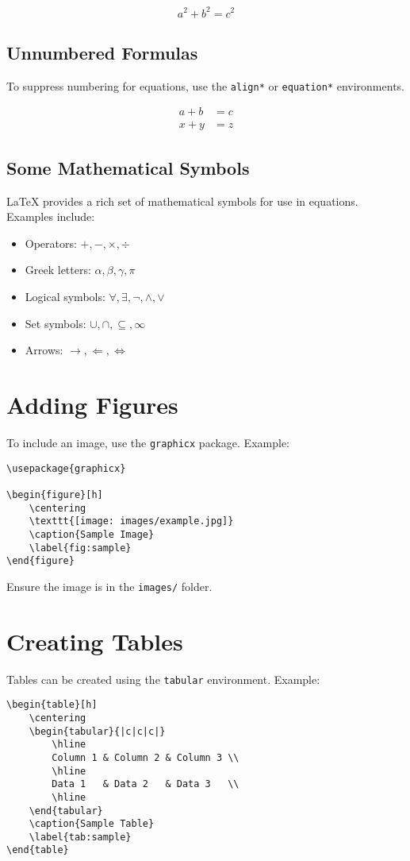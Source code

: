 \documentclass[12pt]{article}
\begin{document}
\[
a^2 + b^2 = c^2 \tag{Pythagoras}
\]

\subsection*{Unnumbered Formulas}
To suppress numbering for equations, use the \texttt{align*} or \texttt{equation*} environments.

\begin{align*}
    a + b &= c \\
    x + y &= z
\end{align*}

\subsection*{Some Mathematical Symbols}
LaTeX provides a rich set of mathematical symbols for use in equations. Examples include:

\begin{itemize}
    \item Operators: \( +, -, \times, \div \)
    \item Greek letters: \( \alpha, \beta, \gamma, \pi \)
    \item Logical symbols: \( \forall, \exists, \neg, \wedge, \vee \)
    \item Set symbols: \( \cup, \cap, \subseteq, \infty \)
    \item Arrows: \( \rightarrow, \Leftarrow, \iff \)
\end{itemize}

\section{Adding Figures}
To include an image, use the \texttt{graphicx} package. Example:
\begin{lstlisting}
\usepackage{graphicx}

\begin{figure}[h]
    \centering
    \texttt{[image: images/example.jpg]}
    \caption{Sample Image}
    \label{fig:sample}
\end{figure}
\end{lstlisting}

Ensure the image is in the \texttt{images/} folder.

\section{Creating Tables}
Tables can be created using the \texttt{tabular} environment. Example:
\begin{lstlisting}
\begin{table}[h]
    \centering
    \begin{tabular}{|c|c|c|}
        \hline
        Column 1 & Column 2 & Column 3 \\
        \hline
        Data 1   & Data 2   & Data 3   \\
        \hline
    \end{tabular}
    \caption{Sample Table}
    \label{tab:sample}
\end{table}
\end{lstlisting}
\end{document}
